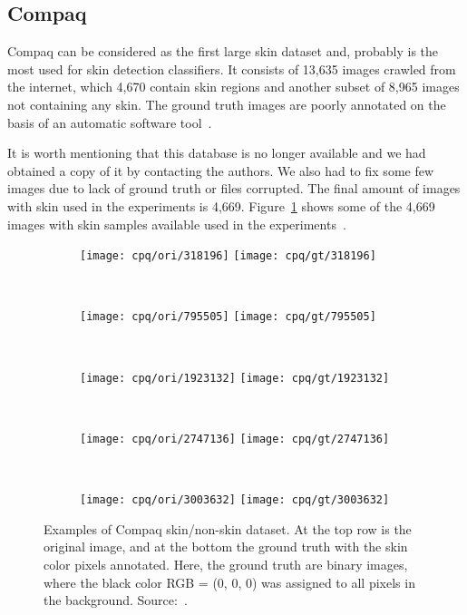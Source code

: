 \subsection{Compaq}
\label{sec:datasets_compaq}
Compaq can be considered as the first large skin dataset and, probably is the most used for skin detection classifiers. It consists of 13,635 images crawled from the internet, which 4,670 contain skin regions and another subset of 8,965 images not containing any skin. The ground truth images are poorly annotated on the basis of an automatic software tool~\citep{mahmoodi:16}.

It is worth mentioning that this database is no longer available and we had obtained a copy of it by contacting the authors. We also had to fix some few images due to lack of ground truth or files corrupted. The final amount of images with skin used in the experiments is 4,669. Figure~\ref{fig:compaq_dataset_example} shows some of the 4,669 images with skin samples available used in the experiments~\citep{jones:02}.

\begin{figure}[H]
    \centering
    \begin{subfigure}[t]{0.269\textwidth}
        \texttt{[image: cpq/ori/318196]}
        \texttt{[image: cpq/gt/318196]}
    \end{subfigure}
    ~
    \begin{subfigure}[t]{0.214\textwidth}
        \texttt{[image: cpq/ori/795505]}
        \texttt{[image: cpq/gt/795505]}
    \end{subfigure}
    ~
    \begin{subfigure}[t]{0.132\textwidth}
        \texttt{[image: cpq/ori/1923132]}
        \texttt{[image: cpq/gt/1923132]}
    \end{subfigure}
    ~
    \begin{subfigure}[t]{0.14\textwidth}
        \texttt{[image: cpq/ori/2747136]}
        \texttt{[image: cpq/gt/2747136]}
    \end{subfigure}
    ~
    \begin{subfigure}[t]{0.12\textwidth}
        \texttt{[image: cpq/ori/3003632]}
        \texttt{[image: cpq/gt/3003632]}
    \end{subfigure}
    \caption[Examples of Compaq skin/non-skin dataset]{Examples of Compaq skin/non-skin dataset. At the top row is the original image, and at the bottom the ground truth with the skin color pixels annotated. Here, the ground truth are binary images, where the black color RGB = (0, 0, 0) was assigned to all pixels in the background. Source:~\citet{jones:02}.}
    \label{fig:compaq_dataset_example}
\end{figure}



